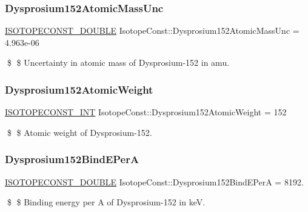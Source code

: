 \subsubsection{\texorpdfstring{Dysprosium152\+Atomic\+Mass\+Unc}{Dysprosium152AtomicMassUnc}}
{\footnotesize\ttfamily \mbox{\hyperlink{group___isotope_const-_macros_ga8f45a7272ce02c0b4c65c44636ed719a}{I\+S\+O\+T\+O\+P\+E\+C\+O\+N\+S\+T\+\_\+\+D\+O\+U\+B\+LE}} Isotope\+Const\+::\+Dysprosium152\+Atomic\+Mass\+Unc = 4.\+963e-\/06}

\$ \$ Uncertainty in atomic mass of Dysprosium-\/152 in amu. \mbox{\label{group___isotope_const-_dysprosium-_dy152_ga43134390d98ba95ff06ce8411183793e}} 
\subsubsection{\texorpdfstring{Dysprosium152\+Atomic\+Weight}{Dysprosium152AtomicWeight}}
{\footnotesize\ttfamily \mbox{\hyperlink{group___isotope_const-_macros_ga5f18360b3e99483a35c32d789e62621c}{I\+S\+O\+T\+O\+P\+E\+C\+O\+N\+S\+T\+\_\+\+I\+NT}} Isotope\+Const\+::\+Dysprosium152\+Atomic\+Weight = 152}

\$ \$ Atomic weight of Dysprosium-\/152. \mbox{\label{group___isotope_const-_dysprosium-_dy152_gad1ff6559a789fcc663158f878e7863b1}} 
\subsubsection{\texorpdfstring{Dysprosium152\+Bind\+E\+PerA}{Dysprosium152BindEPerA}}
{\footnotesize\ttfamily \mbox{\hyperlink{group___isotope_const-_macros_ga8f45a7272ce02c0b4c65c44636ed719a}{I\+S\+O\+T\+O\+P\+E\+C\+O\+N\+S\+T\+\_\+\+D\+O\+U\+B\+LE}} Isotope\+Const\+::\+Dysprosium152\+Bind\+E\+PerA = 8192.}

\$ \$ Binding energy per A of Dysprosium-\/152 in keV. \mbox{\label{group___isotope_const-_dysprosium-_dy152_ga049f843447b829967db335acef9c444f}} 
